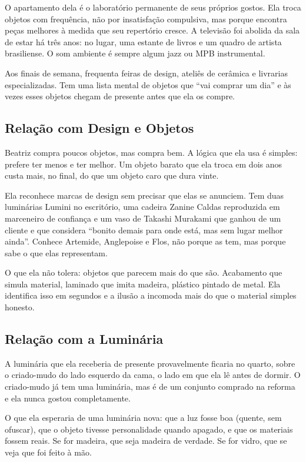 \documentclass[
  12pt,
  a4paper,
  oneside,
  brazil
]{article}
\begin{document}
O apartamento dela é o laboratório permanente de seus próprios gostos. Ela troca
objetos com frequência, não por insatisfação compulsiva, mas porque encontra peças
melhores à medida que seu repertório cresce. A televisão foi abolida da sala de
estar há três anos: no lugar, uma estante de livros e um quadro de artista
brasiliense. O som ambiente é sempre algum jazz ou MPB instrumental.

Aos finais de semana, frequenta feiras de design, ateliês de cerâmica e livrarias
especializadas. Tem uma lista mental de objetos que ``vai comprar um dia'' e às
vezes esses objetos chegam de presente antes que ela os compre.

\subsection{Relação com Design e Objetos}

Beatriz compra poucos objetos, mas compra bem. A lógica que ela usa é simples:
prefere ter menos e ter melhor. Um objeto barato que ela troca em dois anos custa
mais, no final, do que um objeto caro que dura vinte.

Ela reconhece marcas de design sem precisar que elas se anunciem. Tem duas
luminárias Lumini no escritório, uma cadeira Zanine Caldas reproduzida em marceneiro
de confiança e um vaso de Takashi Murakami que ganhou de um cliente e que considera
``bonito demais para onde está, mas sem lugar melhor ainda''. Conhece Artemide,
Anglepoise e Flos, não porque as tem, mas porque sabe o que elas representam.

O que ela não tolera: objetos que parecem mais do que são. Acabamento que simula
material, laminado que imita madeira, plástico pintado de metal. Ela identifica isso
em segundos e a ilusão a incomoda mais do que o material simples honesto.

\subsection{Relação com a Luminária}

A luminária que ela receberia de presente provavelmente ficaria no quarto, sobre
o criado-mudo do lado esquerdo da cama, o lado em que ela lê antes de dormir. O
criado-mudo já tem uma luminária, mas é de um conjunto comprado na reforma e ela
nunca gostou completamente.

O que ela esperaria de uma luminária nova: que a luz fosse boa (quente, sem ofuscar),
que o objeto tivesse personalidade quando apagado, e que os materiais fossem reais.
Se for madeira, que seja madeira de verdade. Se for vidro, que se veja que foi feito
à mão.
\end{document}
